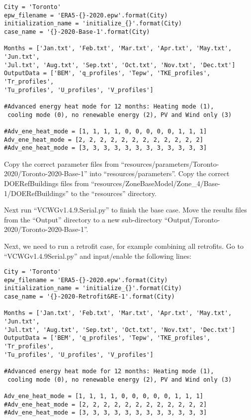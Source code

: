 \documentclass[12pt]{article}
\begin{document}
\begin{verbatim}
City = 'Toronto'
epw_filename = 'ERA5-{}-2020.epw'.format(City)
initialization_name = 'initialize_{}'.format(City)
case_name = '{}-2020-Base-1'.format(City)

Months = ['Jan.txt', 'Feb.txt', 'Mar.txt', 'Apr.txt', 'May.txt', 'Jun.txt', 
'Jul.txt', 'Aug.txt', 'Sep.txt', 'Oct.txt', 'Nov.txt', 'Dec.txt']
OutputData = ['BEM', 'q_profiles', 'Tepw', 'TKE_profiles', 'Tr_profiles', 
'Tu_profiles', 'U_profiles', 'V_profiles']

#Advanced energy heat mode for 12 months: Heating mode (1),
 cooling mode (0), no renewable energy (2), PV and Wind only (3)

#Adv_ene_heat_mode = [1, 1, 1, 1, 0, 0, 0, 0, 0, 1, 1, 1]
Adv_ene_heat_mode = [2, 2, 2, 2, 2, 2, 2, 2, 2, 2, 2, 2]
#Adv_ene_heat_mode = [3, 3, 3, 3, 3, 3, 3, 3, 3, 3, 3, 3]
\end{verbatim}

Copy the correct parameter files from ``resources/parameters/Toronto-2020/Toronto-2020-Base-1'' into ``resources/parameters''. Copy the correct DOERefBuildings files from ``resources/ZoneBaseModel/Zone\_4/Base-1/DOERefBuildings'' to the ``resources'' directory. 

Next run ``VCWGv1.4.9.Serial.py'' to finish the base case. Move the results files from the ``Output'' directory to a new sub-directory ``Output/Toronto-2020/Toronto-2020-Base-1''.

Next, we need to run a retrofit case, for example combining all retrofits. Go to ``VCWGv1.4.9Serial.py'' and input/enable the following lines:

\begin{verbatim}
City = 'Toronto'
epw_filename = 'ERA5-{}-2020.epw'.format(City)
initialization_name = 'initialize_{}'.format(City)
case_name = '{}-2020-Retrofit&RE-1'.format(City)
	
Months = ['Jan.txt', 'Feb.txt', 'Mar.txt', 'Apr.txt', 'May.txt', 'Jun.txt', 
'Jul.txt', 'Aug.txt', 'Sep.txt', 'Oct.txt', 'Nov.txt', 'Dec.txt']
OutputData = ['BEM', 'q_profiles', 'Tepw', 'TKE_profiles', 'Tr_profiles', 
'Tu_profiles', 'U_profiles', 'V_profiles']
	
#Advanced energy heat mode for 12 months: Heating mode (1),
 cooling mode (0), no renewable energy (2), PV and Wind only (3)
	
Adv_ene_heat_mode = [1, 1, 1, 1, 0, 0, 0, 0, 0, 1, 1, 1]
#Adv_ene_heat_mode = [2, 2, 2, 2, 2, 2, 2, 2, 2, 2, 2, 2]
#Adv_ene_heat_mode = [3, 3, 3, 3, 3, 3, 3, 3, 3, 3, 3, 3]
\end{verbatim}
\end{document}
